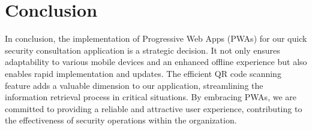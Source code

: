 \documentclass{article}
\begin{document}
	\newpage
	\section{Conclusion}
	In conclusion, the implementation of Progressive Web Apps (PWAs) for our quick security consultation application is a strategic decision. It not only ensures adaptability to various mobile devices and an enhanced offline experience but also enables rapid implementation and updates. The efficient QR code scanning feature adds a valuable dimension to our application, streamlining the information retrieval process in critical situations. By embracing PWAs, we are committed to providing a reliable and attractive user experience, contributing to the effectiveness of security operations within the organization.
	
\end{document}
